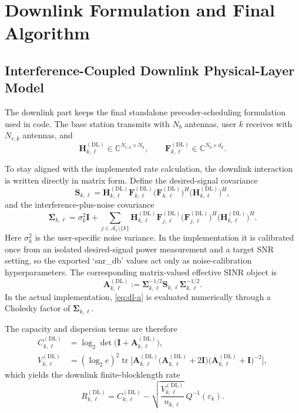 \documentclass[11pt]{article}
\newcommand{\Aset}{\mathcal{A}}
\newcommand{\C}{\mathbb{C}}
\newcommand{\F}{\mathbf{F}}
\newcommand{\Hc}{\mathbf{H}}
\newcommand{\I}{\mathbf{I}}
\newcommand{\A}{\mathbf{A}}
\newcommand{\Sig}{\mathbf{\Sigma}}
\newcommand{\tr}{\operatorname{tr}}
\newcommand{\DL}{\mathrm{DL}}
\begin{document}
\clearpage
\section{Downlink Formulation and Final Algorithm}
\subsection{Interference-Coupled Downlink Physical-Layer Model}
The downlink part keeps the final standalone precoder-scheduling formulation used in code. The base station transmits with $N_b$ antennas, user $k$ receives with $N_{r,k}$ antennas, and
\[
\Hc_{k,\ell}^{(\DL)} \in \C^{N_{r,k} \times N_b},
\qquad
\F_{k,\ell}^{(\DL)} \in \C^{N_b \times d_k}.
\]

To stay aligned with the implemented rate calculation, the downlink interaction is written directly in matrix form. Define the desired-signal covariance
\begin{equation}
\mathbf{S}_{k,\ell}
=
\Hc_{k,\ell}^{(\DL)}
\F_{k,\ell}^{(\DL)}
\bigl(\F_{k,\ell}^{(\DL)}\bigr)^H
\bigl(\Hc_{k,\ell}^{(\DL)}\bigr)^H,
\label{eq:dl-s}
\end{equation}
and the interference-plus-noise covariance
\begin{equation}
\Sig_{k,\ell}
=
\sigma_k^2 \I
+
\sum_{j \in \Aset_\ell \setminus \{k\}}
\Hc_{k,\ell}^{(\DL)}
\F_{j,\ell}^{(\DL)}
\bigl(\F_{j,\ell}^{(\DL)}\bigr)^H
\bigl(\Hc_{k,\ell}^{(\DL)}\bigr)^H.
\label{eq:dl-sigma}
\end{equation}
Here $\sigma_k^2$ is the user-specific noise variance. In the implementation it is calibrated once from an isolated desired-signal power measurement and a target SNR setting, so the exported `snr\_db' values act only as noise-calibration hyperparameters. The corresponding matrix-valued effective SINR object is
\begin{equation}
\A_{k,\ell}^{(\DL)}
:=
\Sig_{k,\ell}^{-1/2}
\mathbf{S}_{k,\ell}
\Sig_{k,\ell}^{-1/2}.
\label{eq:dl-a}
\end{equation}
In the actual implementation, \eqref{eq:dl-a} is evaluated numerically through a Cholesky factor of $\Sig_{k,\ell}$.

The capacity and dispersion terms are therefore
\begin{align}
C_{k,\ell}^{(\DL)}
&=
\log_2 \det\!\bigl(\I + \A_{k,\ell}^{(\DL)}\bigr),
\label{eq:dl-capacity}
\\
V_{k,\ell}^{(\DL)}
&=
(\log_2 e)^2
\tr\!\Big[
\A_{k,\ell}^{(\DL)}
\bigl(\A_{k,\ell}^{(\DL)} + 2\I\bigr)
\bigl(\A_{k,\ell}^{(\DL)} + \I\bigr)^{-2}
\Big],
\label{eq:dl-dispersion}
\end{align}
which yields the downlink finite-blocklength rate
\begin{equation}
R_{k,\ell}^{(\DL)}
=
C_{k,\ell}^{(\DL)}
-
\sqrt{\frac{V_{k,\ell}^{(\DL)}}{n_{k,\ell}}}\,
Q^{-1}(\varepsilon_k).
\label{eq:dl-rate}
\end{equation}
\end{document}
